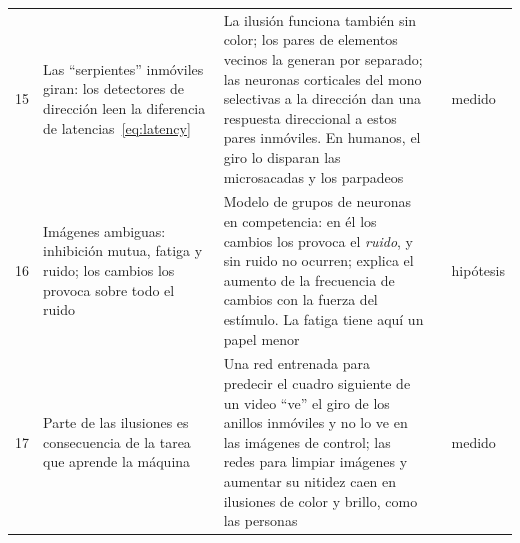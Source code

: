 {\begin{longtable}{>{\raggedright}p{0.5cm}>{\raggedright}p{4.0cm}>{\raggedright}p{5.6cm}>{\raggedright}p{2.3cm}>{\raggedright\arraybackslash}p{1.7cm}}
15 & Las “serpientes” inmóviles giran: los detectores de dirección leen la diferencia de latencias~\eqref{eq:latency} & La ilusión funciona también sin color; los pares de elementos vecinos la generan por separado; las neuronas corticales del mono selectivas a la dirección dan una respuesta direccional a estos pares inmóviles. En humanos, el giro lo disparan las microsacadas y los parpadeos & \cite{Conway2005,OteroMillan2012} & medido \\
16 & Imágenes ambiguas: inhibición mutua, fatiga y ruido; los cambios los provoca sobre todo el ruido & Modelo de grupos de neuronas en competencia: en él los cambios los provoca el \emph{ruido}, y sin ruido no ocurren; explica el aumento de la frecuencia de cambios con la fuerza del estímulo. La fatiga tiene aquí un papel menor & \cite{MorenoBote2007} & hipótesis \\
17 & Parte de las ilusiones es consecuencia de la tarea que aprende la máquina & Una red entrenada para predecir el cuadro siguiente de un video “ve” el giro de los anillos inmóviles y no lo ve en las imágenes de control; las redes para limpiar imágenes y aumentar su nitidez caen en ilusiones de color y brillo, como las personas & \cite{Watanabe2018,GomezVilla2020} & medido \\
\bottomrule
\end{longtable}}
